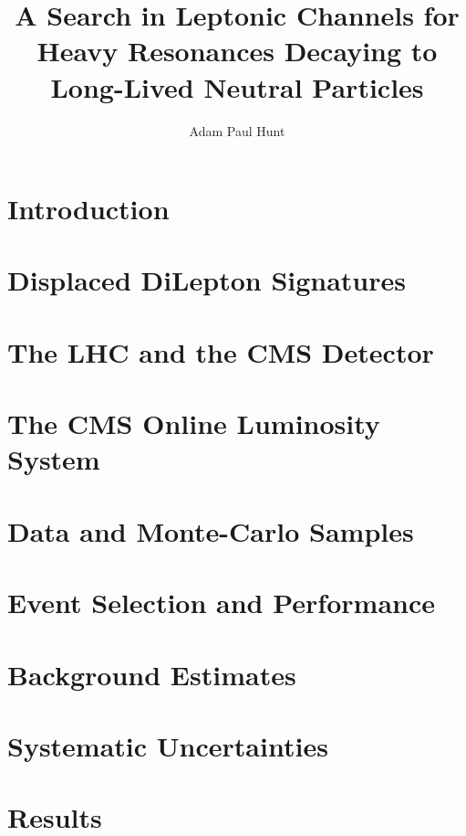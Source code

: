 \documentclass[phd,black]{PrincetonThesis}
\title{A Search in Leptonic Channels for Heavy Resonances Decaying to Long-Lived Neutral Particles}
\author{Adam Paul Hunt}
\begin{document}
\begin{frontmatter}
\end{frontmatter}


\chapter{Introduction}
\chapter{Displaced DiLepton Signatures}
%
%
\chapter{The LHC and the CMS Detector}
\label{chap:cmslhc}
%
%
\chapter{The CMS Online Luminosity System}
\label{chap:lumi}
% 
\chapter{Data and Monte-Carlo Samples}
%
\chapter{Event Selection and Performance}
%
\chapter {Background Estimates}
% 
\chapter{Systematic Uncertainties}
%
\chapter {Results}
%
\end{document}
